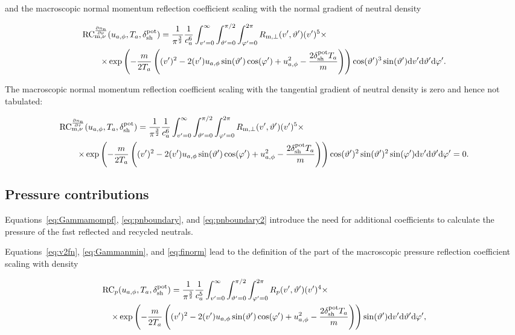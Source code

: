 \noindent and the macroscopic normal momentum reflection coefficient scaling with the normal gradient of neutral density

\begin{align}
    \mathrm{RC}_{\mathrm{m},\nu}^{\frac{\partial n_\mathrm{n}}{\partial \nu}} & (u_{a,\phi},T_a,\delta_{\mathrm{sh}}^{\mathrm{pot}}) =
        \frac{1}{\pi^\frac{3}{2}} \frac{1}{c_a^6} \int_{v'=0}^{\infty} \int_{\vartheta'=0}^{\pi/2} \int_{\varphi'=0}^{2\pi}
    R_{\mathrm{m,\perp}}(v',\vartheta') (v')^5 \times \nonumber \\
    \times & \exp \left( - \frac{m}{2 T_a} \left( (v')^2-2 (v') u_{a,\phi} \sin (\vartheta') \cos (\varphi') + u_{a,\phi}^2 - \frac{2 \delta_{\mathrm{sh}}^{\mathrm{pot}} T_a}{m} \right) \right) \cos (\vartheta')^3 \sin (\vartheta')
    \mathrm{d} v' \mathrm{d} \vartheta' \mathrm{d} \varphi'. \label{eq:rmztwoi_def}
\end{align}

\noindent The macroscopic normal momentum reflection coefficient scaling with the tangential gradient of neutral density is zero and hence not tabulated:

\begin{align}
    \mathrm{RC}_{\mathrm{m},\nu}^{\frac{\partial n_\mathrm{n}}{\partial \tau}} & (u_{a,\phi},T_a,\delta_{\mathrm{sh}}^{\mathrm{pot}}) =
        \frac{1}{\pi^\frac{3}{2}} \frac{1}{c_a^6} \int_{v'=0}^{\infty} \int_{\vartheta'=0}^{\pi/2} \int_{\varphi'=0}^{2\pi}
    R_{\mathrm{m,\perp}}(v',\vartheta') (v')^5 \times \nonumber \\
    \times & \exp \left( - \frac{m}{2 T_a} \left( (v')^2-2 (v') u_{a,\phi} \sin (\vartheta') \cos (\varphi') + u_{a,\phi}^2 - \frac{2 \delta_{\mathrm{sh}}^{\mathrm{pot}} T_a}{m} \right) \right) \cos (\vartheta')^2 \sin (\vartheta')^2 \sin (\varphi')
    \mathrm{d} v' \mathrm{d} \vartheta' \mathrm{d} \varphi' = 0.
\end{align}

\subsection{Pressure contributions}

Equations~\eqref{eq:Gammamompf}, \eqref{eq:pnboundary}, and \eqref{eq:pnboundary2} introduce the need for additional coefficients to calculate the pressure of the fast reflected and recycled neutrals.

Equations~\eqref{eq:v2fn}, \eqref{eq:Gammanmin}, and \eqref{eq:finorm} lead to the definition of the part of the macroscopic pressure reflection coefficient scaling with density

\begin{align}
    \mathrm{RC}_{p} & (u_{a,\phi},T_a,\delta_{\mathrm{sh}}^{\mathrm{pot}}) =
        \frac{1}{\pi^\frac{3}{2}} \frac{1}{c_a^5} \int_{v'=0}^{\infty} \int_{\vartheta'=0}^{\pi/2} \int_{\varphi'=0}^{2\pi}
    R_p(v',\vartheta') (v')^4 \times \nonumber \\
    \times & \exp \left( - \frac{m}{2 T_a} \left( (v')^2-2 (v') u_{a,\phi} \sin (\vartheta') \cos (\varphi') + u_{a,\phi}^2 - \frac{2 \delta_{\mathrm{sh}}^{\mathrm{pot}} T_a}{m} \right) \right) \sin (\vartheta')
    \mathrm{d} v' \mathrm{d} \vartheta' \mathrm{d} \varphi', \label{eq:rponeonei_def}
\end{align}

